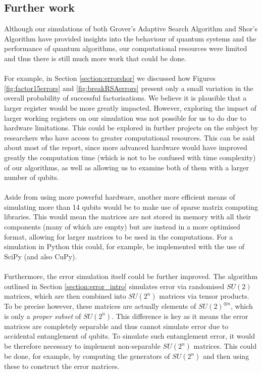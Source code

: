 \documentclass{article}[11pt]
\begin{document}
\subsection{Further work}
Although our simulations of both Grover's Adaptive Search Algorithm and Shor's Algorithm have provided insights into the behaviour of quantum systems and the performance of quantum algorithms, our computational resources were limited and thus there is still much more work that could be done.\\
\\
For example, in Section \ref{section:errorshor} we discussed how Figures \ref{fig:factor15errors} and \ref{fig:breakRSAerrors} present only a small variation in the overall probability of successful factorisations. We believe it is plausible that a larger register would be more greatly impacted. However, exploring the impact of larger working registers on our simulation was not possible for us to do due to hardware limitations. This could be explored in further projects on the subject by researchers who have access to greater computational resources. This can be said about most of the report, since more advanced hardware would have improved greatly the computation time (which is not to be confused with time complexity) of our algorithms, as well as allowing us to examine both of them with a larger number of qubits.\\
\\
Aside from using more powerful hardware, another more efficient means of simulating more than 14 qubits would be to make use of sparse matrix computing libraries. This would
mean the matrices are not stored in memory with all their components (many of which are empty) but are instead in a more optimised format, allowing for larger matrices to be used in the computations.\cite{candela} For a simulation in Python this could, for example, be implemented with the use of SciPy (and also CuPy).\cite{cupy2017,2020SciPy-NMeth}\\
\\
Furthermore, the error simulation itself could be further improved. The algorithm outlined in Section \ref{section:error_intro} simulates error via randomised $SU(2)$ matrices, which are then combined into $SU(2^n)$ matrices via tensor products. To be precise however, these matrices are actually elements of $SU(2)^{\otimes n}$, which is only a \emph{proper subset} of $SU(2^n)$.\cite{chenGroup} This difference is key as it means the error matrices are completely separable and thus cannot simulate error due to accidental entanglement of qubits. To simulate such entanglement error, it would be therefore necessary to implement non-separable $SU(2^n)$ matrices. This could be done, for example, by computing the generators of $SU(2^n)$ and then using these to construct the error matrices.
\end{document}
